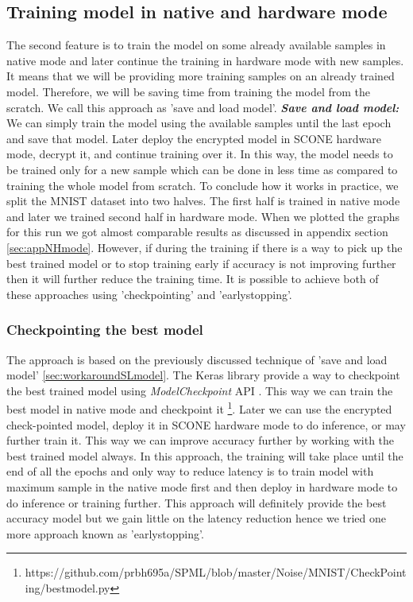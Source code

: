 \subsection{Training model in native and hardware mode}
The second feature is to train the model on some already available samples in native mode and later continue the training in hardware mode with new samples. It means that we will be providing more training samples on an already trained model. Therefore, we will be saving time from training the model from the scratch. We call this approach as 'save and load model'. \newline
\newline
\textbf{\textit{Save and load model: }}
\label{sec:workaroundSLmodel}
We can simply train the model using the available samples until the last epoch and save that model. Later deploy the encrypted model in SCONE hardware mode, decrypt it, and continue training over it. In this way, the model needs to be trained only for a new sample which can be done in less time as compared to training the whole model from scratch. To conclude how it works in practice, we split the MNIST dataset into two halves. The first half is trained in native mode and later we trained second half in hardware mode. When we plotted the graphs for this run we got almost comparable results as discussed in appendix section \ref{sec:appNHmode}. However, if during the training if there is a way to pick up the best trained model or to stop training early if accuracy is not improving further then it will further reduce the training time. It is possible to achieve both of these approaches using 'checkpointing' and 'earlystopping'.

\subsubsection{Checkpointing the best model}
The approach is based on the previously discussed technique of 'save and load model' \ref{sec:workaroundSLmodel}. The Keras \cite{83} library provide a way to checkpoint the best trained model using \textit{ModelCheckpoint} API \cite{84}. This way we can train the best model in native mode and checkpoint it \footnote{https://github.com/prbh695a/SPML/blob/master/Noise/MNIST/CheckPointing/bestmodel.py}. Later we can use the encrypted check-pointed model, deploy it in SCONE hardware mode to do inference, or may further train it. This way we can improve accuracy further by working with the best trained model always. In this approach, the training will take place until the end of all the epochs and only way to reduce latency is to train model with maximum sample in the native mode first and then deploy in hardware mode to do inference or training further. This approach will definitely provide the best accuracy model but we gain little on the latency reduction hence we tried one more approach known as 'earlystopping'.

